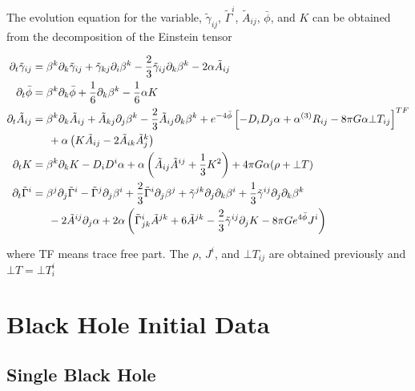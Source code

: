 \documentclass[%
 reprint,
 amsmath,amssymb,
 aps,
]{revtex4-1}
\begin{document}
The evolution equation for the variable, $\tilde{\gamma}_{ij}$, $\tilde{\Gamma}^i$, $\tilde{A}_{ij}$, $\bar{\phi}$, and $K$ can be obtained from the decomposition of the Einstein tensor
\begin{widetext}
\begin{align}
\partial_t \tilde{\gamma}_{ij} &= \beta^k \partial_k \tilde{\gamma}_{ij} + \tilde{\gamma}_{kj} \partial_i \beta^k -\frac{2}{3} \tilde{\gamma}_{ij} \partial_k \beta^k - 2 \alpha \tilde{A}_{ij} \\
\partial_t \bar{\phi} &= \beta^k \partial_k \bar{\phi} + \frac{1}{6} \partial_k \beta^k - \frac{1}{6} \alpha K \\
\partial_t \tilde{A}_{ij} &= \beta^k \partial_k \tilde{A}_{ij} + \tilde{A}_{kj} \partial_j \beta^k -\frac{2}{3} \tilde{A}_{ij} \partial_k \beta^k + e^{-4 \bar{\phi}} \left[ - D_i D_j \alpha + \alpha ^{(3)}R_{ij} - 8 \pi G \alpha \bot T_{ij}\right]^{TF} \nonumber \\
				&\indent + \alpha \left( K \tilde{A}_{ij} - 2 \tilde{A}_{ik} \tilde{A}_{j}^k \right) \\
\partial_t K &= \beta^k \partial_k K - D_i D^i \alpha + \alpha \left(\tilde{A}_{ij} \tilde{A}^{ij} + \frac{1}{3} K^2 \right) + 4 \pi G \alpha ( \rho + \bot T) \\
\partial_t \tilde{\Gamma}^i &= \beta^j \partial_j \tilde{\Gamma}^i - \tilde{\Gamma}^j \partial_j \beta^i+ \frac{2}{3} \tilde{\Gamma}^i \partial_j \beta^j + \tilde{\gamma}^{jk} \partial_j \partial_k \beta^i + \frac{1}{3} \tilde{\gamma}^{ij} \partial_j \partial_k \beta^k \nonumber \\
					&\indent - 2 \tilde{A}^{ij} \partial_j \alpha + 2 \alpha \left(\tilde{\Gamma}_{jk}^i \tilde{A}^{jk} + 6 \tilde{A}^{jk} -\frac{2}{3} \tilde{\gamma}^{ij} \partial_j K - 8 \pi G e^{4 \bar{\phi}} J^i \right)
\end{align}
\end{widetext}
where TF means trace free part. The $\rho$, $J^i$, and $\bot T_{ij}$ are obtained previously and $\bot T = \bot T_i^i$

\section{Black Hole Initial Data}
\subsection{Single Black Hole}
\end{document}
